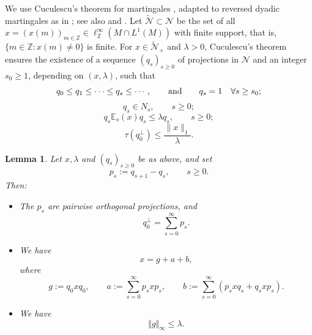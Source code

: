 \documentclass[12pt]{amsart}
\newcommand{\N}{\mbox{${\mathcal N}$}}
\newcommand{\norm}[1]{\Vert#1\Vert}
\newtheorem{lemma}[theorem]{Lemma}
\theoremstyle{remark}
\theoremstyle{definition}
\numberwithin{equation}{section}
\begin{document}
We use Cuculescu's theorem for martingales \cite{C}, adapted to
reversed dyadic martingales as in \cite[Subsection 2.3]{HLX};
see also \cite[Subsection 3.1]{P} and
\cite[Subsection 1.1]{CCAP}.
Let $\widetilde{\N}\subset\N$ be the set of all
$x=(x(m))_{m\in\mathbb Z}\in
\ell^\infty_{\mathbb Z}(M\cap L^1(M))$ with finite support, that is, $\{m\in\mathbb Z:x(m)\ne0\}$ is finite. 
For $x\in\widetilde{\N}_+$ and $\lambda>0$, Cuculescu's theorem
ensures the existence of a sequence $(q_s)_{s\geq0}$ of projections in
$\N$ and an integer $s_0\geq1$, depending on $(x,\lambda)$, such that
\begin{equation}\label{4Increase}
q_0\leq q_1\leq\cdots\leq q_s\leq\cdots,
\qquad\hbox{and}\qquad q_s=1\quad\forall s\geq s_0;
\end{equation}
\begin{equation}\label{4qs}
q_s\in N_s,\qquad s\geq0;
\end{equation}
\begin{equation}\label{4Lambda-qs}
q_s\mathbb{E}_s(x)q_s\leq\lambda q_s,\qquad s\geq0;
\end{equation}
\begin{equation}\label{4L1-estimate}
\tau(q_0^\perp)\leq\frac{\|x\|_1}{\lambda}.
\end{equation}

\begin{lemma}\label{4CZ-Dec}
Let $x,\lambda$ and $(q_s)_{s\geq0}$ be as above, and set
$$
p_s:=q_{s+1}-q_s,\qquad s\geq0.
$$
Then:
\begin{itemize}
\item[(1)] The $p_s$ are pairwise orthogonal projections, and
\begin{equation}\label{4Sumps}
q_0^\perp=\sum_{s=0}^\infty p_s.
\end{equation}

\item[(2)] We have
$$
x=g+a+b,
$$
where
\[
g:=q_0xq_0,\qquad
a:=\sum_{s=0}^\infty p_sxp_s,\qquad
b:=\sum_{s=0}^\infty(p_sxq_s+q_sxp_s).
\]

\item[(3)] We have
$$
\norm{g}_\infty\leq\lambda.
$$
\end{itemize}
\end{lemma}
\end{document}

